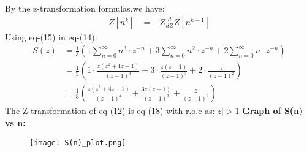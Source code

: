 \documentclass[journal,12pt,twocolumn]{IEEEtran}
\theoremstyle{remark}
\begin{document}
By the z-transformation formulas,we have:
\begin{align}
     Z[n^k]&=-Z\frac{d}{dZ}Z[n^{k-1}]
\end{align}
Using eq-(15) in eq-(14):
\begin{align}
    S(z)&=\frac{1}{3} \left( 1 \sum_{n=0}^{\infty} n^3 \cdot z^{-n} + 3 \sum_{n=0}^{\infty} n^2 \cdot z^{-n} + 2 \sum_{n=0}^{\infty} n \cdot z^{-n} \right)\\
    &=\frac{1}{3} \left( 1 \cdot \frac{z(z^2+4z+1)}{(z-1)^4} + 3 \cdot \frac{z(z+1)}{(z-1)^3} + 2 \cdot \frac{z}{(z-1)^2} \right)\\
    &=\frac{1}{3} \left( \frac{z(z^2+4z+1)}{(z-1)^4} + \frac{3z(z+1)}{(z-1)^3} + \frac{z}{(z-1)^2} \right)
\end{align}
The Z-transformation of eq-(12) is eq-(18) with r.o.c as:$|z|>1$
\newpage
\textbf{Graph of S(n) vs n:}
\begin{figure}[h]
        \centering
\texttt{[image: S(n)\_plot.png]}
    \end{figure}
\end{document}
